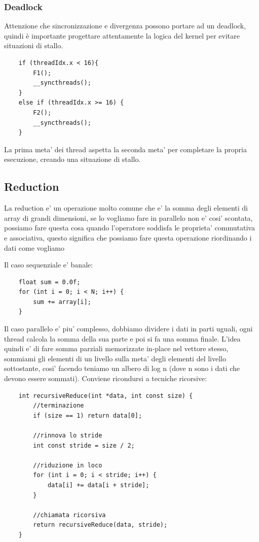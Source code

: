 \subsubsection{Deadlock}
Attenzione che sincronizzazione e divergenza possono portare ad un deadlock, quindi è importante progettare attentamente la logica del kernel per evitare situazioni di stallo.
\begin{lstlisting}
    if (threadIdx.x < 16){
        F1();
        __syncthreads();
    }
    else if (threadIdx.x >= 16) {
        F2();
        __syncthreads();
    }
\end{lstlisting}

La prima meta' dei thread aspetta la seconda meta' per completare la propria esecuzione, creando una situazione di stallo.

\subsection{Reduction}
La reduction e' un operazione molto comune che e' la somma degli elementi di array di grandi dimensioni, se lo vogliamo fare in parallelo non e' cosi' scontata, possiamo fare questa cosa quando l'operatore soddisfa le proprieta' commutativa e associativa, questo significa che possiamo fare questa operazione riordinando i dati come vogliamo

Il caso sequenziale e' banale:
\begin{lstlisting}
    float sum = 0.0f;
    for (int i = 0; i < N; i++) {
        sum += array[i];
    }
\end{lstlisting}

Il caso parallelo e' piu' complesso, dobbiamo dividere i dati in parti uguali, ogni thread calcola la somma della sua parte e poi si fa una somma finale. L'idea quindi e' di fare somma parziali memorizzate in-place nel vettore stesso, sommiami gli elementi di un livello sulla meta' degli elementi del livello sottostante, cosi' facendo teniamo un albero di log n (dove n sono i dati che devono essere sommati).
Conviene ricondursi a tecniche ricorsive:
\begin{lstlisting}
    int recursiveReduce(int *data, int const size) {
        //terminazione
        if (size == 1) return data[0];

        //rinnova lo stride
        int const stride = size / 2;

        //riduzione in loco
        for (int i = 0; i < stride; i++) {
            data[i] += data[i + stride];
        }

        //chiamata ricorsiva
        return recursiveReduce(data, stride);
    }
\end{lstlisting}

